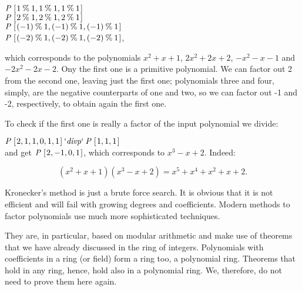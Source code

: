 \documentclass[tikz]{scrreprt}
\newcommand{\Conid}[1]{\mathit{#1}}
\newcommand{\Varid}[1]{\mathit{#1}}
\begin{document}
\ensuremath{\Conid{P}\;[\mskip1.5mu \mathrm{1}\mathbin{\%}\mathrm{1},\mathrm{1}\mathbin{\%}\mathrm{1},\mathrm{1}\mathbin{\%}\mathrm{1}\mskip1.5mu]}\\
\ensuremath{\Conid{P}\;[\mskip1.5mu \mathrm{2}\mathbin{\%}\mathrm{1},\mathrm{2}\mathbin{\%}\mathrm{1},\mathrm{2}\mathbin{\%}\mathrm{1}\mskip1.5mu]}\\
\ensuremath{\Conid{P}\;[\mskip1.5mu (\mathbin{-}\mathrm{1})\mathbin{\%}\mathrm{1},(\mathbin{-}\mathrm{1})\mathbin{\%}\mathrm{1},(\mathbin{-}\mathrm{1})\mathbin{\%}\mathrm{1}\mskip1.5mu]}\\
\ensuremath{\Conid{P}\;[\mskip1.5mu (\mathbin{-}\mathrm{2})\mathbin{\%}\mathrm{1},(\mathbin{-}\mathrm{2})\mathbin{\%}\mathrm{1},(\mathbin{-}\mathrm{2})\mathbin{\%}\mathrm{1}\mskip1.5mu]},

which corresponds to the polynomials
$x^2+x+1$, $2x^2+2x+2$,
$-x^2-x -1$ and $-2x^2-2x-2$.
Ony the first one is a primitive polynomial.
We can factor out 2 from the second one,
leaving just the first one;
polynomials three and four, simply, are 
the negative counterparts of one and two,
so we can factor out -1 and -2, respectively,
to obtain again the first one.

To check if the first one is really a factor
of the input polynomial we divide:

\ensuremath{\Conid{P}\;[\mskip1.5mu \mathrm{2},\mathrm{1},\mathrm{1},\mathrm{0},\mathrm{1},\mathrm{1}\mskip1.5mu]\mathbin{`\Varid{divp}`}\Conid{P}\;[\mskip1.5mu \mathrm{1},\mathrm{1},\mathrm{1}\mskip1.5mu]}\\
 and get
\ensuremath{\Conid{P}\;[\mskip1.5mu \mathrm{2},\mathbin{-}\mathrm{1},\mathrm{0},\mathrm{1}\mskip1.5mu]}, which corresponds to 
$x^3 - x + 2$. Indeed:

\begin{equation}
(x^2 + x + 1)(x^3 - x + 2) = x^5 + x^4 + x^2 + x + 2.
\end{equation}

Kronecker's method is just a brute force search.
It is obvious that it is not efficient and will fail
with growing degrees and coefficients.
Modern methods to factor polynomials use
much more sophisticated techniques.

They are, in particular, based on modular arithmetic
and make use of theorems that we have
already discussed in the ring of integers.
Polynomials with coefficients in a ring (or field)
form a ring too, a polynomial ring.
Theorems that hold in any ring, hence, hold also
in a polynomial ring. We, therefore, do not need
to prove them here again.
\end{document}
